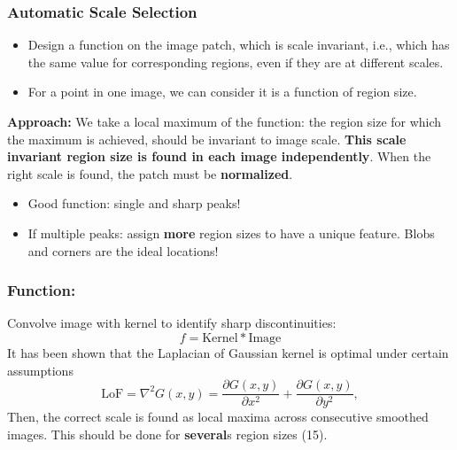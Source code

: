 \documentclass[a4paper,12 pt]{article}
\theoremstyle{definition}
\theoremstyle{remark}
\theoremstyle{definition}
\theoremstyle{definition}
\theoremstyle{definition}
\theoremstyle{remark}
\theoremstyle{definition}
\begin{document}
\subsubsection*{Automatic Scale Selection}
\begin{itemize}
\item Design a function on the image patch, which is scale invariant, i.e., which has the same value for corresponding regions, even if they are at different scales.
\item For a point in one image, we can consider it is a function of region size.
\end{itemize}
\textbf{Approach:} We take a local maximum of the function: the region size for which the maximum is achieved, should be invariant to image scale. \textbf{This scale invariant region size is found in each image independently}. When the right scale is found, the patch must be \textbf{normalized}.
\begin{itemize}
\item Good function: single and sharp peaks!
\item If multiple peaks: assign \textbf{more} region sizes to have a unique feature. Blobs and corners are the ideal locations!
\end{itemize}
\subsubsection*{Function:} Convolve image with kernel to identify sharp discontinuities:
\begin{equation}
f=\text{Kernel}*\text{Image}
\end{equation}
It has been shown that the Laplacian of Gaussian kernel is optimal under certain assumptions
\begin{equation}
\text{LoF}=\nabla^2G(x,y)=\frac{\partial G(x,y)}{\partial x^2}+\frac{\partial G(x,y)}{\partial y^2},
\end{equation}
Then, the correct scale is found as local maxima across consecutive smoothed images. This should be done for \textbf{several}s region sizes (15).
\end{document}
